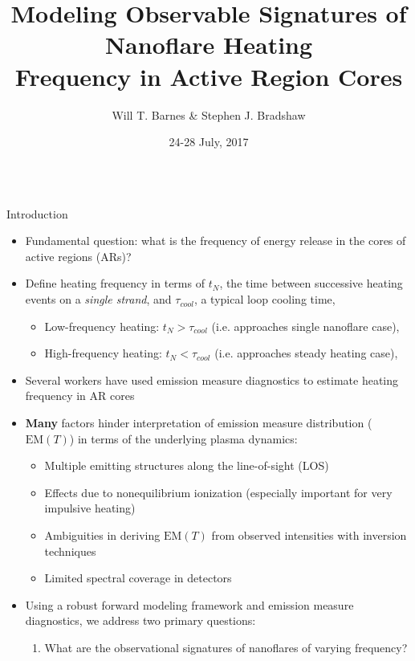\documentclass[final]{beamer}
\title[Observable Signatures of Nanoflares]{Modeling Observable Signatures of Nanoflare Heating\\Frequency in Active Region Cores}
\author[Barnes \& Bradshaw]{Will T. Barnes \& Stephen J. Bradshaw}
\institute[Rice University]{Department of Physics and Astronomy\\Rice University}
\date{24-28 July, 2017}
\begin{document}
\begin{frame}
  \begin{columns}[T]
  \hfill
  \begin{column}{0.49\linewidth}
    \begin{block}{Introduction}
    \begin{itemize}
      \item Fundamental question: \alert{what is the frequency of energy release in the cores of active regions (ARs)?}
      \item Define heating frequency in terms of $t_N$, the time between successive heating events on a \textit{single strand}, and $\tau_{cool}$, a typical loop cooling time,
      \begin{itemize}
        \item Low-frequency heating: $t_N>\tau_{cool}$ (i.e. approaches single nanoflare case), 
        \item High-frequency heating: $t_N<\tau_{cool}$ (i.e. approaches steady heating case), 
      \end{itemize}
      \item Several workers \citep{warren_constraints_2011,winebarger_using_2011,mulu-moore_can_2011,tripathi_emission_2011,schmelz_cold_2012,warren_systematic_2012,del_zanna_evolution_2015} have used emission measure diagnostics to estimate heating frequency in AR cores
      \item \textbf{Many} factors hinder interpretation of emission measure distribution ($\mathrm{EM}(T)$) in terms of the underlying plasma dynamics:
      \begin{itemize}
        \item Multiple emitting structures along the line-of-sight (LOS)
        \item Effects due to nonequilibrium ionization (especially important for very impulsive heating)
        \item Ambiguities in deriving $\mathrm{EM}(T)$ from observed intensities with inversion techniques
        \item Limited spectral coverage in detectors
      \end{itemize}
      \item Using a robust forward modeling framework and emission measure diagnostics, we address two primary questions:
      \begin{enumerate}
        \item \alert{What are the observational signatures of nanoflares of varying frequency?}

\end{enumerate}
\end{itemize}
\end{block}
\end{column}
\end{columns}
\end{frame}
\end{document}
